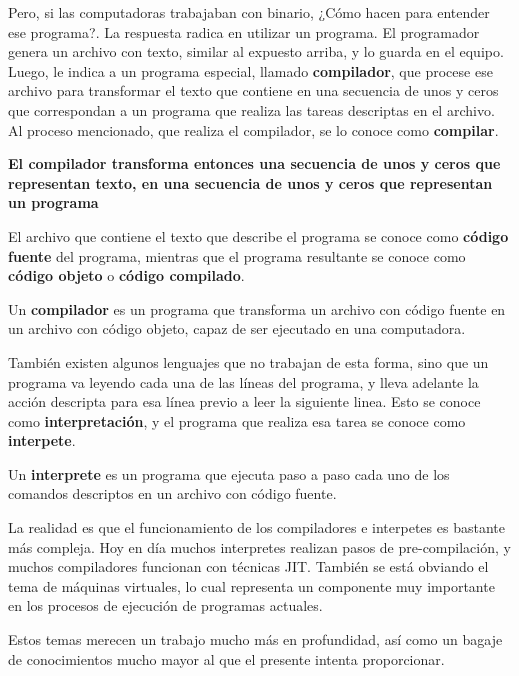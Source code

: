 Pero, si las computadoras trabajaban con binario, ¿Cómo hacen para entender ese
programa?. La respuesta radica en utilizar un programa. El programador genera un
archivo con texto, similar al expuesto arriba, y lo guarda en el equipo. Luego,
le indica a un programa especial, llamado \textbf{compilador}, que procese ese
archivo para transformar el texto que contiene en una secuencia de unos y ceros
que correspondan a un programa que realiza las tareas descriptas en el archivo.
Al proceso mencionado, que realiza el compilador, se lo conoce como \textbf{compilar}.

\textbf{El compilador transforma entonces una secuencia de unos y ceros que representan
texto, en una secuencia de unos y ceros que representan un programa}

El archivo que contiene el texto que describe el programa se conoce como
\textbf{código fuente} del programa, mientras que el programa resultante se conoce como
\textbf{código objeto} o \textbf{código compilado}.

\begin{definition}
    Un \textbf{compilador} es un programa que transforma un archivo con código fuente
    en un archivo con código objeto, capaz de ser ejecutado en una computadora.
\end{definition}

También existen algunos lenguajes que no trabajan de esta forma, sino que un programa
va leyendo cada una de las líneas del programa, y lleva adelante la acción descripta
para esa línea previo a leer la siguiente linea. Esto se conoce como \textbf{interpretación},
y el programa que realiza esa tarea se conoce como \textbf{interpete}.

\begin{definition}
    Un \textbf{interprete} es un programa que ejecuta paso a paso cada uno de los
    comandos descriptos en un archivo con código fuente.
\end{definition}

\begin{knowwhat}[Simplificación]
    La realidad es que el funcionamiento de los compiladores e interpetes es
    bastante más compleja. Hoy en día muchos interpretes realizan pasos de
    pre-compilación, y muchos compiladores funcionan con técnicas JIT. También
    se está obviando el tema de máquinas virtuales, lo cual representa un
    componente muy importante en los procesos de ejecución de programas actuales.

    Estos temas merecen un trabajo mucho más en profundidad, así como un bagaje
    de conocimientos mucho mayor al que el presente intenta proporcionar.
\end{knowwhat}

